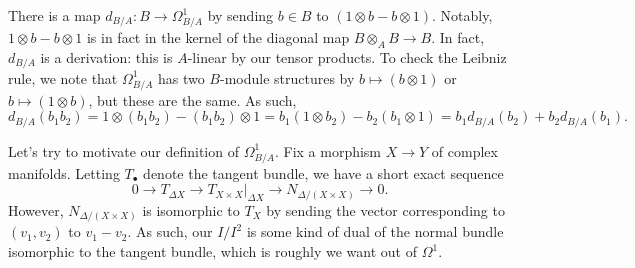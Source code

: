 \documentclass[../notes.tex]{subfiles}
\begin{document}
\begin{remark}
	There is a map $d_{B/A}\colon B\to\Omega^1_{B/A}$ by sending $b\in B$ to $(1\otimes b-b\otimes1)$. Notably, $1\otimes b-b\otimes1$ is in fact in the kernel of the diagonal map $B\otimes_AB\to B$. In fact, $d_{B/A}$ is a derivation: this is $A$-linear by our tensor products. To check the Leibniz rule, we note that $\Omega^1_{B/A}$ has two $B$-module structures by $b\mapsto(b\otimes1)$ or $b\mapsto(1\otimes b)$, but these are the same. As such,
	\[d_{B/A}(b_1b_2)=1\otimes(b_1b_2)-(b_1b_2)\otimes1=b_1(1\otimes b_2)-b_2(b_1\otimes1)=b_1d_{B/A}(b_2)+b_2d_{B/A}(b_1).\]
\end{remark}
\begin{remark}
	Let's try to motivate our definition of $\Omega^1_{B/A}$. Fix a morphism $X\to Y$ of complex manifolds. Letting $T_\bullet$ denote the tangent bundle, we have a short exact sequence
	\[0\to T_{\Delta X}\to T_{X\times X}|_{\Delta X}\to N_{\Delta/(X\times X)}\to0.\]
	However, $N_{\Delta/(X\times X)}$ is isomorphic to $T_X$ by sending the vector corresponding to $(v_1,v_2)$ to $v_1-v_2$. As such, our $I/I^2$ is some kind of dual of the normal bundle isomorphic to the tangent bundle, which is roughly we want out of $\Omega^1$.
\end{remark}
\end{document}
